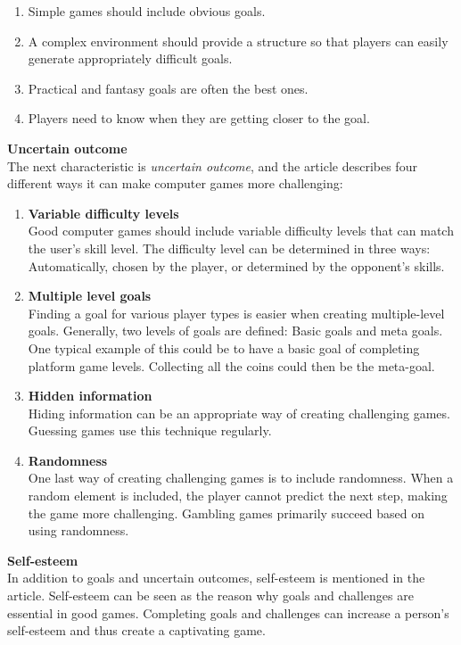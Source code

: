 \begin{enumerate}
    \item Simple games should include obvious goals.
    \item A complex environment should provide a structure so that players can easily generate appropriately difficult goals.
    \item Practical and fantasy goals are often the best ones.
    \item Players need to know when they are getting closer to the goal.
\end{enumerate}

\textbf{Uncertain outcome} \\
The next characteristic is \textit{uncertain outcome}, and the article describes four different ways  it can make computer games more challenging:

\begin{enumerate}
    \item \textbf{Variable difficulty levels}\\ 
    Good computer games should include variable difficulty levels that can match the user’s skill level. The difficulty level can be determined in three ways: Automatically, chosen by the player, or determined by the opponent’s skills.
    \item \textbf{Multiple level goals} \\ 
    Finding a goal for various player types is easier when creating multiple-level goals. Generally, two levels of goals are defined: Basic goals and meta goals. One typical example of this could be to have a basic goal of completing platform game levels. Collecting all the coins could then be the meta-goal. 
    \item \textbf{Hidden information} \\
    Hiding information can be an appropriate way of creating challenging games. Guessing games use this technique regularly.
    \item \textbf{Randomness} \\
    One last way of creating challenging games is to include randomness. When a random element is included, the player cannot predict the next step, making the game more challenging. Gambling games primarily succeed based on using randomness.
\end{enumerate}

\textbf{Self-esteem} \\
In addition to goals and uncertain outcomes, self-esteem is mentioned in the article. Self-esteem can be seen as the reason why goals and challenges are essential in good games. Completing goals and challenges can increase a person’s self-esteem and thus create a captivating game.

